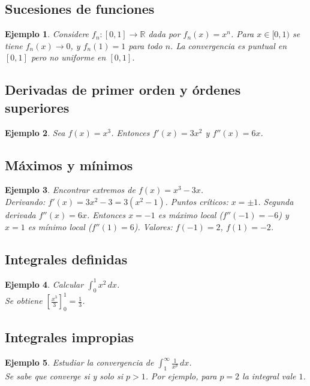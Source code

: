 \documentclass[12pt]{article}
\newtheorem{example}{Ejemplo}[section]
\begin{document}
\subsection{Sucesiones de funciones}
\begin{example}
Considere $f_n:[0,1]\to\mathbb{R}$ dada por $f_n(x)=x^n$. Para $x\in[0,1)$ se tiene $f_n(x)\to0$, y $f_n(1)=1$ para todo $n$. La convergencia es puntual en $[0,1]$ pero no uniforme en $[0,1]$.
\end{example}

\subsection{Derivadas de primer orden y órdenes superiores}
\begin{example}
Sea $f(x)=x^3$. Entonces $f'(x)=3x^2$ y $f''(x)=6x$.
\end{example}

\subsection{Máximos y mínimos}
\begin{example}
Encontrar extremos de $f(x)=x^3-3x$.\\
Derivando: $f'(x)=3x^2-3=3(x^2-1)$. Puntos críticos: $x=\pm1$. Segunda derivada $f''(x)=6x$. Entonces $x=-1$ es máximo local ($f''(-1)=-6$) y $x=1$ es mínimo local ($f''(1)=6$). Valores: $f(-1)=2$, $f(1)=-2$.
\end{example}

\subsection{Integrales definidas}
\begin{example}
Calcular $\displaystyle\int_0^1 x^2\,dx$.\\
Se obtiene $\left[\tfrac{x^3}{3}\right]_0^1=\tfrac{1}{3}$.
\end{example}

\subsection{Integrales impropias}
\begin{example}
Estudiar la convergencia de $\displaystyle\int_1^{\infty}\frac{1}{x^p}\,dx$.\\
Se sabe que converge si y solo si $p>1$. Por ejemplo, para $p=2$ la integral vale $1$.
\end{example}
\end{document}
